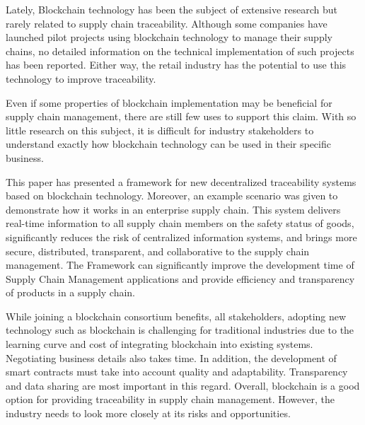 \acresetall 
\label{chap:conclusion}

Lately, Blockchain technology has been the subject of extensive research but rarely related to supply chain traceability. Although some companies have launched pilot projects using blockchain technology to manage their supply chains, no detailed information on the technical implementation of such projects has been reported. Either way, the retail industry has the potential to use this technology to improve traceability.

Even if some properties of blockchain implementation may be beneficial for supply chain management, there are still few uses to support this claim. With so little research on this subject, it is difficult for industry stakeholders to understand exactly how blockchain technology can be used in their specific business.

This paper has presented a framework for new decentralized traceability systems based on blockchain technology. Moreover, an example scenario was given to demonstrate how it works in an enterprise supply chain. This system delivers real-time information to all supply chain members on the safety status of goods, significantly reduces the risk of centralized information systems, and brings more secure, distributed, transparent, and collaborative to the supply chain management. The Framework can significantly improve the development time of Supply Chain Management applications and provide efficiency and transparency of products in a supply chain.

While joining a blockchain consortium benefits, all stakeholders, adopting new technology such as blockchain is challenging for traditional industries due to the learning curve and cost of integrating blockchain into existing systems. Negotiating business details also takes time. In addition, the development of smart contracts must take into account quality and adaptability. Transparency and data sharing are most important in this regard. Overall, blockchain is a good option for providing traceability in supply chain management. However, the industry needs to look more closely at its risks and opportunities.


